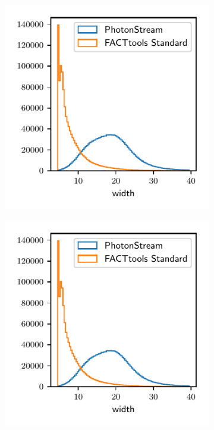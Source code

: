\begin{figure}
\begin{subfigure}{0.5\textwidth}
    \includegraphics[width=\textwidth, page=2]{Plots/std_phs_comparison_hist_same_DBSCAN_crab.pdf}
  \end{subfigure}
  \begin{subfigure}{0.5\textwidth}
    \centering
  \includegraphics[width=\textwidth, page=5]{Plots/std_phs_comparison_hist_same_DBSCAN_crab.pdf}

\end{subfigure}
\end{figure}
